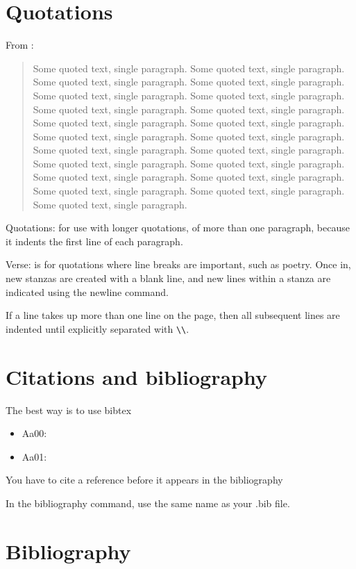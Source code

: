 \documentclass[12pt]{article}
\begin{document}
\section{Quotations}\label{quotations}

  From \cite{Aa00}:

  \begin{quote}
    Some quoted text, single paragraph. Some quoted text, single paragraph. Some quoted text, single paragraph.
    Some quoted text, single paragraph. Some quoted text, single paragraph. Some quoted text, single paragraph.
    Some quoted text, single paragraph. Some quoted text, single paragraph. Some quoted text, single paragraph.
    Some quoted text, single paragraph. Some quoted text, single paragraph. Some quoted text, single paragraph.
    Some quoted text, single paragraph. Some quoted text, single paragraph. Some quoted text, single paragraph.
    Some quoted text, single paragraph. Some quoted text, single paragraph. Some quoted text, single paragraph.
    Some quoted text, single paragraph. Some quoted text, single paragraph. Some quoted text, single paragraph.
  \end{quote}

  Quotations: for use with longer quotations, of more than one paragraph,
  because it indents the first line of each paragraph.

  Verse: is for quotations where line breaks are important, such as poetry.
  Once in, new stanzas are created with a blank line, and new lines within
  a stanza are indicated using the newline command.

  If a line takes up more than one line on the page, then all subsequent lines
  are indented until explicitly separated with \lstinline|\\|.

\section{Citations and bibliography}\label{secCit}

  The best way is to use bibtex

  \begin{itemize}
    \item Aa00: \cite{Aa00}
    \item Aa01: \cite{Aa01}
  \end{itemize}

  You have to cite a reference before it appears in the bibliography

  In the bibliography command, use the same name as your .bib file.

\section{Bibliography}\label{secBib}

  \newpage
  
\end{document}
